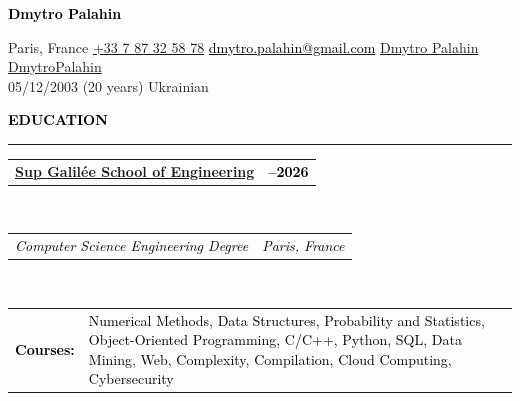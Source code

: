 \documentclass[10pt,english,french]{article}
\makeatletter
\newcommand{\linkedinIcon}[1][black]{\textcolor{#1}{\faLinkedin}}
\newcommand{\githubIcon}[1][black]{\textcolor{#1}{\faGithub}}
\newcommand{\emailIcon}[1][black]{\textcolor{#1}{\faEnvelope}}
\newcommand{\emailLink}[2][black]{\href{mailto:#2}{\emailIcon[black] \textcolor{#1}{#2}}}
\newcommand{\locationIcon}[1][black]{\textcolor{#1}{\faMapMarker}}
\newcommand{\phoneIcon}[1][black]{\textcolor{#1}{\faPhone}}
\newcommand{\educationIcon}[1][black]{\textcolor{#1}{\faGraduationCap}}
\newcommand{\birthdayIcon}[1][black]{\textcolor{#1}{\faUser}}
\newcommand{\nationalityIcon}[1][black]{\textcolor{#1}{\faGlobe}}
\newlength{\mpwidth}
\newcommand{\cvname}[1]{
    \begin{center}
        \textbf{\textcolor{black}{\fontsize{17pt}{12pt}\selectfont #1}}
    \end{center}
}
\newcommand{\cvsection}[1]{
    \vspace{5pt}
    \textbf{\fontsize{12pt}{10pt}\selectfont \textcolor{black}{#1}}
    \vspace{8pt}
    \hrule
    \vspace{8pt}
}
\newcommand{\cvevent}[2]{
    \vspace{2pt}
    \parbox{\mpwidth}{
        \begin{tabular*}{1\mpwidth}{@{\extracolsep{\fill}} l r}
            \textcolor{black}{\textbf{\fontsize{11}{12}\selectfont #1}} & \textcolor{black}{\textbf{\fontsize{12}{12}\selectfont #2}} \\
        \end{tabular*}\\[-8pt] %
    }
}
\newcommand{\cvsubevent}[2]{
    \parbox{\mpwidth}{
        \begin{tabular*}{1\mpwidth}{@{\extracolsep{\fill}} l r}
            \textcolor{black}{\textit{\fontsize{10}{12}\selectfont #1}} & \textcolor{black}{\textit{\fontsize{10}{12}\selectfont #2}} \\
        \end{tabular*}\\[-8pt] %
    }
    \vspace{-10pt}
}
\newcommand{\cvcourses}[2]{
    \begin{tabularx}{\mpwidth}{@{}lX@{}}
        \textcolor{black}{\textbf{\fontsize{10}{12}\selectfont #1}} & \textcolor{black}{\fontsize{10}{12}\selectfont #2}
    \end{tabularx}
    \vspace{12pt}
}
\makeatother
\begin{document}
\sloppy             %
\hfuzz=10000pt      %

\cvname{Dmytro Palahin}
\vspace{-15pt}
\begin{center}
    \locationIcon[black]\hspace{4pt}Paris, France\hspace{6pt}
    \href{tel:+33787325878}{\phoneIcon[black]\hspace{3pt} +33 7 87 32 58 78}\hspace{6pt}
    \emailLink[black]{dmytro.palahin@gmail.com}\hspace{6pt}
    \linkedinIcon[black]\hspace{3pt}\href{https://www.linkedin.com/in/dmytro-palahin/}{Dmytro Palahin}\hspace{6pt}
    \githubIcon[black]\hspace{3pt}\href{https://github.com/DmytroPalahin}{DmytroPalahin}\\
    \birthdayIcon[black]\hspace{6pt}05/12/2003 (20 years)\hspace{6pt}
    \nationalityIcon[black]\hspace{6pt}Ukrainian\hspace{6pt}
\end{center}

\vspace{-15pt}
\cvsection{\educationIcon[black]\hspace{4pt}EDUCATION}

\vspace{-7pt}
\cvevent{\href{https://www.sup-galilee.univ-paris13.fr/}{Sup Galilée School of Engineering}}{2023\hspace{5pt}--\hspace{5pt}2026}
\cvsubevent{Computer Science Engineering Degree}{Paris, France}
\cvcourses{Courses:}{Numerical Methods, Data Structures, Probability and Statistics, Object-Oriented Programming, C/C++, Python, SQL, Data Mining, Web, Complexity, Compilation, Cloud Computing, Cybersecurity}
\end{document}
